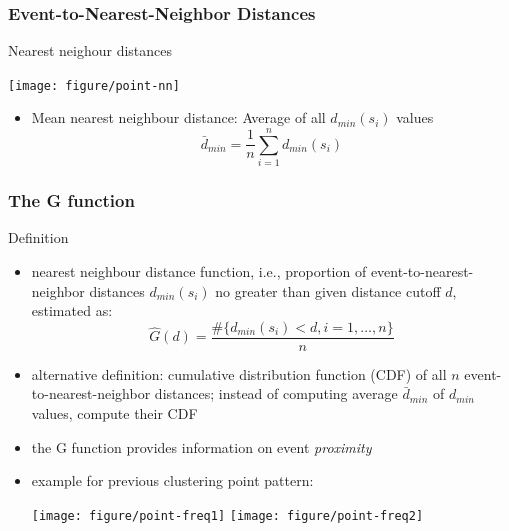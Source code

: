 \documentclass[10pt]{beamer}\usepackage[]{graphicx}\usepackage[]{color}
\newenvironment{knitrout}{}{} %
\newcommand{\bitemize}{\begin{itemize}}
\newcommand{\eitemize}{\end{itemize}}
\newcommand{\bblock}{\begin{block}}
\newcommand{\eblock}{\end{block}}
\begin{document}
\begin{frame}
\frametitle{Event-to-Nearest-Neighbor Distances}

\bblock{Nearest neighour distances}
\begin{knitrout}
\color{fgcolor}

{\centering \texttt{[image: figure/point-nn]} 

}



\end{knitrout}


\bitemize
\item Mean nearest neighbour distance: Average of all $d_{min}(s_i)$ values
\[
\bar{d}_{min} = \frac{1}{n}\sum\limits_{i=1}^{n}d_{min}(s_i)
\]
\eitemize


\eblock
\end{frame}

\begin{frame}
\frametitle{The G function}
\bblock{Definition}
\bitemize
\item nearest neighbour distance function, i.e.,  proportion of event-to-nearest-neighbor distances $d_{min}(s_i)$
no greater than given distance cutoff $d$, estimated as:
\[
\hat{G}(d) = \frac{\#\{d_{min}(s_i)<d, i = 1, \ldots, n\}}{n}
\]
 
\item alternative definition: cumulative distribution function
(CDF) of all $n$ event-to-nearest-neighbor distances; instead of computing average  $\bar{d}_{min}$ of $d_{min}$ values, compute their CDF
\item the G function provides information on event {\it proximity}
\item example for previous clustering point pattern:


{\centering \texttt{[image: figure/point-freq1]} 
\texttt{[image: figure/point-freq2]} 

}




\eitemize
\eblock
\end{frame}
\end{document}

